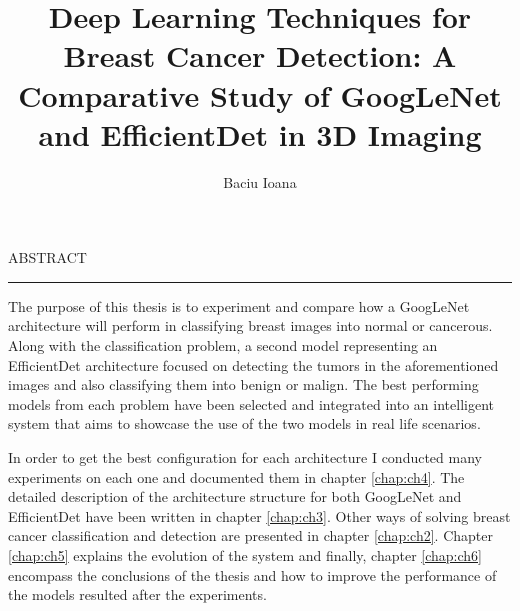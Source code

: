 \documentclass[12pt]{report}
\begin{document}
\title{Deep Learning Techniques for Breast Cancer Detection: A Comparative Study of GoogLeNet and EfficientDet in 3D Imaging}					   
\author{Baciu Ioana}											
				
\maketitle


\newpage
\thispagestyle{empty}
\mbox{}
\newpage
{} 

\cleardoublepage
ABSTRACT
\vspace{0.5cm}	
\hrule
\vspace{0.5cm}	




The purpose of this thesis is to experiment and compare how a GoogLeNet architecture will perform in classifying breast images into normal or cancerous. Along with the classification problem, a second model representing an EfficientDet architecture focused on detecting the tumors in the aforementioned images and also classifying them into benign or malign. The best performing models from each problem have been selected and integrated into an intelligent system that aims to showcase the use of the two models in real life scenarios. 

In order to get the best configuration for each architecture I conducted many experiments on each one and documented them in chapter \ref{chap:ch4}. The detailed description of the architecture structure for both GoogLeNet and EfficientDet have been written in chapter \ref{chap:ch3}. Other ways of solving breast cancer classification and detection are presented in chapter \ref{chap:ch2}. Chapter \ref{chap:ch5} explains the evolution of the system and finally, chapter \ref{chap:ch6} encompass the conclusions of the thesis and how to improve the performance of the models resulted after the experiments.

\tableofcontents


\newpage
{}













\end{document}
